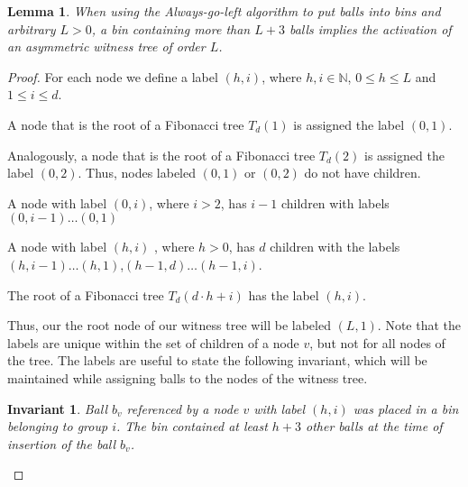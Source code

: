 \documentclass[a4paper,12pt]{article}
\newtheorem{lemma}{Lemma}
\newtheorem{invariant}{Invariant}
\begin{document}
\begin{lemma}
When using the Always-go-left algorithm to put balls into bins and arbitrary $L > 0$, a bin containing more than $L+3$ balls implies the activation of an asymmetric witness tree of order $L$.
\end{lemma}
\begin{proof}
For each node we define a label $(h, i)$, where $h, i \in \mathbb{N}$, $0 \leq h \leq L$ and  $1\leq i \leq d$. 
\begin{compactitem}
\item A node that is the root of a Fibonacci tree $T_d(1)$ is assigned the label $(0,1)$.
\item Analogously, a node that is the root of a Fibonacci tree $T_d(2)$ is assigned the label $(0,2)$. Thus, nodes labeled $(0,1)$ or $(0,2)$ do not have children.
\item A node with label $(0, i)$, where $i>2$, has $i-1$ children with labels $(0,i-1)\dots (0,1)$
\item A node with label $(h,i)$ , where $h>0$, has $d$ children with the labels $(h,i-1)\dots(h,1)$,$(h-1,d)\dots(h-1, i)$.
\item The root of a Fibonacci tree $T_d(d\cdot h+i)$ has the label $(h, i)$. 
\end{compactitem}
Thus, our the root node of our witness tree will be labeled $(L, 1)$. Note that the labels are unique within the set of children of a node $v$, but not for all nodes of the tree. The labels are useful to state the following invariant, which will be maintained while assigning balls to the nodes of the witness tree.

\begin{invariant}
Ball $b_v$ referenced by a node $v$ with label $(h,i)$ was placed in a bin belonging to group $i$. The bin contained at least $h+3$ other balls at the time of insertion of the ball $b_v$.
\end{invariant}


\end{proof}
\end{document}
